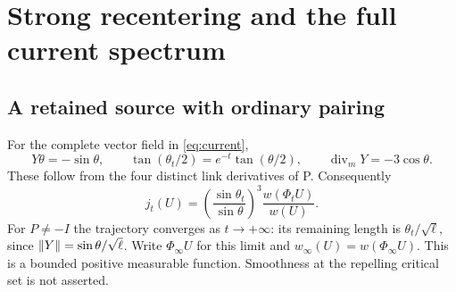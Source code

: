 \section{Strong recentering and the full current spectrum}\label{sec:recentering}
\subsection{A retained source with ordinary \Ltwo{} pairing}
For the complete vector field in \eqref{eq:current},
\begin{equation}
Y\theta=-\sin\theta,\qquad
\tan(\theta_t/2)=e^{-t}\tan(\theta/2),\qquad
\operatorname{div}_mY=-3\cos\theta.
\end{equation}
These follow from the four distinct link derivatives of P.
Consequently
\begin{equation}\label{eq:flow-jacobian}
j_t(U)=\left(\frac{\sin\theta_t}{\sin\theta}\right)^3
                     \frac{w(\Phi_tU)}{w(U)} .
\end{equation}
For $P\ne-I$ the trajectory converges as $t\to+\infty$:
its remaining length is $\theta_t/\sqrt\ell$, since
$\left\lVert Y\right\rVert=\sin\theta/\sqrt\ell$.
Write $\Phi_\infty U$ for this limit and
$w_\infty(U)=w(\Phi_\infty U)$. This is a bounded positive
measurable function. Smoothness at the repelling critical set
is not asserted.


